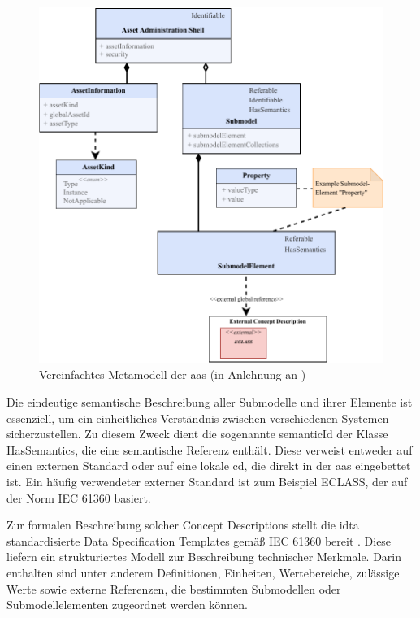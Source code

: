 \newpage
\begin{figure}[htbp]
    \centering
    \includegraphics[width=1\textwidth]{Bilder/Metamodell/MetamodellFarbig.pdf}
    \caption[Vereinfachtes Metamodell der \acs{aas}]{Vereinfachtes Metamodell der \acs{aas} (in Anlehnung an \cite{SpezifikationPart1})}
    \label{fig:MetamodellAAS}
\end{figure}

Die eindeutige semantische Beschreibung aller Submodelle und ihrer Elemente ist essenziell, um ein einheitliches Verständnis zwischen verschiedenen Systemen sicherzustellen.
Zu diesem Zweck dient die sogenannte semanticId der Klasse HasSemantics, die eine semantische Referenz enthält.
Diese verweist entweder auf einen externen Standard oder auf eine lokale \ac{cd}, die direkt in der \acs{aas} eingebettet ist.
Ein häufig verwendeter externer Standard ist zum Beispiel ECLASS, der auf der Norm IEC 61360 \cite{ECLASSIEC61360} basiert.

Zur formalen Beschreibung solcher Concept Descriptions stellt die \acs{idta} standardisierte Data Specification Templates gemäß IEC 61360 bereit \cite{SpezifikationPart3a}.
Diese liefern ein strukturiertes Modell zur Beschreibung technischer Merkmale.
Darin enthalten sind unter anderem Definitionen, Einheiten, Wertebereiche, zulässige Werte sowie externe Referenzen, die bestimmten Submodellen oder Submodellelementen zugeordnet werden können.

